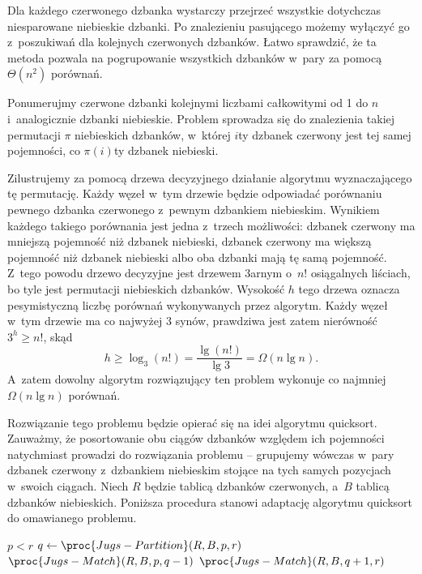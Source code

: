 
\subproblem %
Dla każdego czerwonego dzbanka wystarczy przejrzeć wszystkie dotychczas niesparowane niebieskie dzbanki.
Po znalezieniu pasującego możemy wyłączyć go z~poszukiwań dla kolejnych czerwonych dzbanków.
Łatwo sprawdzić, że ta metoda pozwala na pogrupowanie wszystkich dzbanków w~pary za pomocą $\Theta(n^2)$ porównań.

\subproblem %
Ponumerujmy czerwone dzbanki kolejnymi liczbami całkowitymi od 1 do $n$ i~analogicznie dzbanki niebieskie.
Problem sprowadza się do znalezienia takiej permutacji $\pi$ niebieskich dzbanków, w~której $i$\nbhyphen ty dzbanek czerwony jest tej samej pojemności, co $\pi(i)$\nbhyphen ty dzbanek niebieski.

Zilustrujemy za pomocą drzewa decyzyjnego działanie algorytmu wyznaczającego tę permutację.
Każdy węzeł w~tym drzewie będzie odpowiadać porównaniu pewnego dzbanka czerwonego z~pewnym dzbankiem niebieskim.
Wynikiem każdego takiego porównania jest jedna z~trzech możliwości: dzbanek czerwony ma mniejszą pojemność niż dzbanek niebieski, dzbanek czerwony ma większą pojemność niż dzbanek niebieski albo oba dzbanki mają tę samą pojemność.
Z~tego powodu drzewo decyzyjne jest drzewem 3\nbhyphen arnym o~$n!$ osiągalnych liściach, bo tyle jest permutacji niebieskich dzbanków.
Wysokość $h$ tego drzewa oznacza pesymistyczną liczbę porównań wykonywanych przez algorytm.
Każdy węzeł w~tym drzewie ma co najwyżej 3 synów, prawdziwa jest zatem nierówność $3^h\ge n!$, skąd
\[
	h \ge \log_3(n!) = \frac{\lg(n!)}{\lg3} = \Omega(n\lg n).
\]
A~zatem dowolny algorytm rozwiązujący ten problem wykonuje co najmniej $\Omega(n\lg n)$ porównań.

\subproblem %
Rozwiązanie tego problemu będzie opierać się na idei algorytmu quicksort.
Zauważmy, że posortowanie obu ciągów dzbanków względem ich pojemności natychmiast prowadzi do rozwiązania problemu -- grupujemy wówczas w~pary dzbanek czerwony z~dzbankiem niebieskim stojące na tych samych pozycjach w~swoich ciągach.
Niech $R$ będzie tablicą dzbanków czerwonych, a~$B$ tablicą dzbanków niebieskich.
Poniższa procedura stanowi adaptację algorytmu quicksort do omawianego problemu.
\begin{codebox}
\li	\If $p<r$
\li		\Then $q\gets\proc{Jugs-Partition}(R,B,p,r)$
\li			$\proc{Jugs-Match}(R,B,p,q-1)$
\li			$\proc{Jugs-Match}(R,B,q+1,r)$
		\End
\end{codebox}

